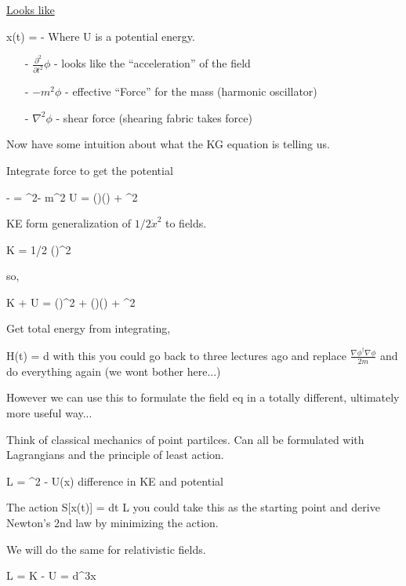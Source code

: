 {\underline{Looks like}

\be
{}x(t)  =  -
\ee
Where U is a potential energy.

\begin{itemize}
\item[-] $\frac{\partial^2}{\partial t^2}\phi$ - looks like the ``acceleration'' of the field
\item[-] $- m^2 \phi$ - effective ``Force'' for the mass (harmonic oscillator)
\item[-] $\nabla^2\phi$ - shear force (shearing fabric takes force)
\end{itemize}

Now have some intuition about what the KG equation is telling us.

Integrate force to get the potential

\be
- = \nabla^2\phi - m^2 \phi \Rightarrow U = (\nabla \phi)(\nabla \phi) + \phi^2
\ee

KE form generalization of $1/2 \dot{x}^2$ to fields.

\be
K = 1/2 (\phi)^2
\ee

so,

\be
K + U  =  (\phi)^2 + (\nabla \phi)(\nabla \phi) + \phi^2
\ee

Get total energy from integrating, 

\be
H(t) = \int d 
\ee
with this you could go back to three lectures ago and replace $\frac{\nabla\phi^\dagger\nabla\phi}{2m}$ and do everything again (we wont bother here...)


However we can use this to formulate the field eq in a totally different, ultimately more useful way...


Think of classical mechanics of point partilces.
Can all be formulated with Lagrangians and the principle of least action. 


\be
L = ^2 - U(x)
\ee 
difference in KE and potential

The action
\be
S[x(t)] = \int dt L
\ee
you could take this as the starting point and derive Newton's 2nd law by minimizing the action.

We will do the same for relativistic fields.

\be
L = K - U = \int d^3x 
\ee



}
